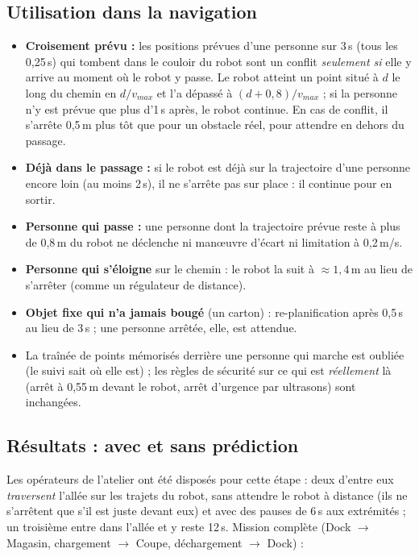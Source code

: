 \documentclass[11pt,a4paper]{article}
\begin{document}
\subsection{Utilisation dans la navigation}
\begin{itemize}
  \item \textbf{Croisement prévu :} les positions prévues d'une personne sur 3\,s (tous les
        0,25\,s) qui tombent dans le couloir du robot sont un conflit \emph{seulement si} elle y
        arrive au moment où le robot y passe. Le robot atteint un point situé à $d$ le long du
        chemin en $d / v_{max}$ et l'a dépassé à $(d + 0{,}8)/v_{max}$ ; si la personne n'y est
        prévue que plus d'1\,s après, le robot continue. En cas de conflit, il s'arrête 0,5\,m plus
        tôt que pour un obstacle réel, pour attendre en dehors du passage.
  \item \textbf{Déjà dans le passage :} si le robot est déjà sur la trajectoire d'une personne
        encore loin (au moins 2\,s), il ne s'arrête pas sur place : il continue pour en sortir.
  \item \textbf{Personne qui passe :} une personne dont la trajectoire prévue reste à plus de
        0,8\,m du robot ne déclenche ni manœuvre d'écart ni limitation à 0,2\,m/s.
  \item \textbf{Personne qui s'éloigne} sur le chemin : le robot la suit à $\approx 1{,}4$\,m au
        lieu de s'arrêter (comme un régulateur de distance).
  \item \textbf{Objet fixe qui n'a jamais bougé} (un carton) : re-planification après 0,5\,s au
        lieu de 3\,s ; une personne arrêtée, elle, est attendue.
  \item La traînée de points mémorisés derrière une personne qui marche est oubliée (le suivi
        sait où elle est) ; les règles de sécurité sur ce qui est \emph{réellement} là (arrêt à
        0,55\,m devant le robot, arrêt d'urgence par ultrasons) sont inchangées.
\end{itemize}

\subsection{Résultats : avec et sans prédiction}
Les opérateurs de l'atelier ont été disposés pour cette étape : deux d'entre eux \emph{traversent}
l'allée sur les trajets du robot, sans attendre le robot à distance (ils ne s'arrêtent que s'il est
juste devant eux) et avec des pauses de 6\,s aux extrémités ; un troisième entre dans l'allée et y
reste 12\,s. Mission complète (Dock $\rightarrow$ Magasin, chargement $\rightarrow$ Coupe,
déchargement $\rightarrow$ Dock) :
\end{document}
